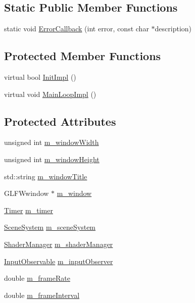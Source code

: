 \subsection*{Static Public Member Functions}
\begin{DoxyCompactItemize}
\item 
static void \mbox{\hyperlink{classngl_1_1_window_ac1e0712951df9d90c1a11af5cb8bfbb9}{Error\+Callback}} (int error, const char $\ast$description)
\end{DoxyCompactItemize}
\subsection*{Protected Member Functions}
\begin{DoxyCompactItemize}
\item 
virtual bool \mbox{\hyperlink{classngl_1_1_window_a0c1cca132de77c543688e8339a806f2b}{Init\+Impl}} ()
\item 
virtual void \mbox{\hyperlink{classngl_1_1_window_a7366fe9aa69b6f4bfa73d4feacb31787}{Main\+Loop\+Impl}} ()
\end{DoxyCompactItemize}
\subsection*{Protected Attributes}
\begin{DoxyCompactItemize}
\item 
unsigned int \mbox{\hyperlink{classngl_1_1_window_a04f530842b0b3509be8337c06dad806d}{m\+\_\+window\+Width}}
\item 
unsigned int \mbox{\hyperlink{classngl_1_1_window_ac364c4ea0f23674b12cd336b24538cf2}{m\+\_\+window\+Height}}
\item 
std\+::string \mbox{\hyperlink{classngl_1_1_window_a2336390ab4b8659c327e95c667604511}{m\+\_\+window\+Title}}
\item 
G\+L\+F\+Wwindow $\ast$ \mbox{\hyperlink{classngl_1_1_window_a0d7e38c5567aa58dfb515fcc932c7e80}{m\+\_\+window}}
\item 
\mbox{\hyperlink{classngl_1_1_timer}{Timer}} \mbox{\hyperlink{classngl_1_1_window_a17a77b957430101bb66b40a1c158d558}{m\+\_\+timer}}
\item 
\mbox{\hyperlink{classngl_1_1_scene_system}{Scene\+System}} \mbox{\hyperlink{classngl_1_1_window_a2be5327b3e12cf7e9355abcebb86c084}{m\+\_\+scene\+System}}
\item 
\mbox{\hyperlink{classngl_1_1_shader_manager}{Shader\+Manager}} \mbox{\hyperlink{classngl_1_1_window_adc6a4cf2d5cf529d8c503085f1b7945f}{m\+\_\+shader\+Manager}}
\item 
\mbox{\hyperlink{classngl_1_1_input_observable}{Input\+Observable}} \mbox{\hyperlink{classngl_1_1_window_a987412b58f3a40a2775ef308c328be70}{m\+\_\+input\+Observer}}
\item 
double \mbox{\hyperlink{classngl_1_1_window_a2cc289db06c31280db7b6ad2bf413b8a}{m\+\_\+frame\+Rate}}
\item 
double \mbox{\hyperlink{classngl_1_1_window_a28cc3f9f91354a13bc94bc905b23f9d4}{m\+\_\+frame\+Interval}}
\end{DoxyCompactItemize}


